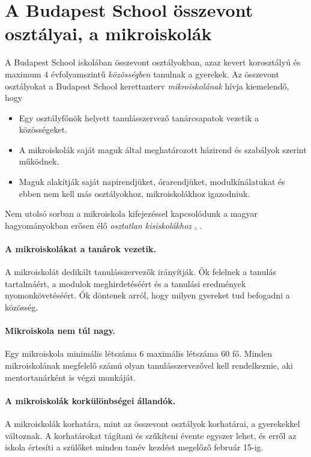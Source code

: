 \section{A Budapest School összevont osztályai, a mikroiskolák}

A Budapest School iskolában összevont osztályokban, azaz kevert
korosztályú és maximum 4 évfolyamszintű \emph{közösségben} tanulnak a gyerekek.
Az összevont osztályokat a Budapest School kerettanterv
\emph{mikroiskolának} hívja kiemelendő, hogy
\begin{itemize}
    \item Egy osztályfőnök helyett tanulásszervező tanárcsapatok vezetik a
          közösségeket.
    \item A mikroiskolák saját maguk által meghatározott házirend és szabályok
          szerint működnek.
    \item Maguk alakítják saját napirendjüket, órarendjüket, modulkínálatukat és ebben nem kell
          más osztályokhoz, mikroiskolákhoz igazodniuk.

\end{itemize}
Nem utolsó sorban a mikroiskola kifejezéssel kapcsolódunk a magyar
hagyományokban erősen élő
\emph{osztatlan kisiskolákhoz}
\citep{kisiskolak}, \citep{khan2012one}.

\paragraph{A mikroiskolákat a tanárok vezetik.}
A mikroiskolát dedikált tanulásszervezők irányítják. Ők felelnek a tanulás
tartalmáért, a
modulok meghirdetéséért és a tanulási eredmények nyomonkövetéséért. Ők döntenek
arról, hogy milyen gyereket tud befogadni a közösség.

\paragraph{Mikroiskola nem túl nagy.} Egy
mikroiskola minimális létszáma 6 maximális létszáma 60 fő. Minden
mikroiskolának megfelelő számú olyan
tanulásszervezővel kell rendelkeznie, aki mentortanárként is végzi munkáját.

\paragraph{A mikroiskolák korkülönbségei állandók.}
A mikroiskolák korhatára, mint az összevont osztályok korhatárai, a gyerekekkel
változnak. A korhatárokat tágítani és szűkíteni évente egyszer lehet, és erről
az iskola értesíti a szülőket minden tanév kezdést megelőző február 15-ig.

